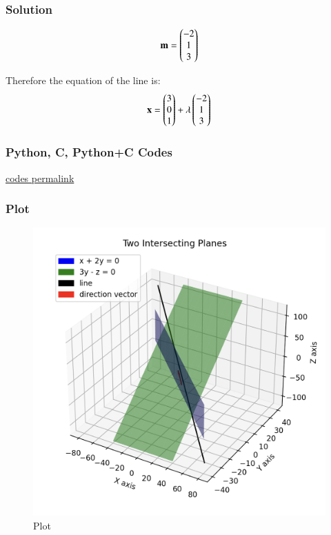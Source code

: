 \documentclass{beamer}
\begin{document}
\begin{frame}[fragile]
    \frametitle{Solution}

\begin{align}
\mathbf{m}= \begin{pmatrix}-2\\1\\3\end{pmatrix}
\end{align}

Therefore the equation of the line is:
\begin{align}
\mathbf{x} = \begin{pmatrix}3\\0\\1\end{pmatrix} + \lambda\begin{pmatrix}-2\\1\\3\end{pmatrix}
\end{align}
\end{frame}


\begin{frame}[fragile]
    \frametitle{Python, C, Python+C Codes}

\href{https://github.com/AdityaAppana/ee1030-2025/tree/8428703b12dd76c7f155f1738158e50a858c4817/ee25btech11004/matgeo/4.5.6/Codes}{codes permalink}

\end{frame}

\begin{frame}
\frametitle{Plot}
\begin{figure}[H]
    \centering
    \includegraphics[width=0.6\columnwidth]{Figs/Plot7.png}
    \caption{Plot}
    \label{fig:placeholder}
\end{figure}

\end{frame}
\end{document}
